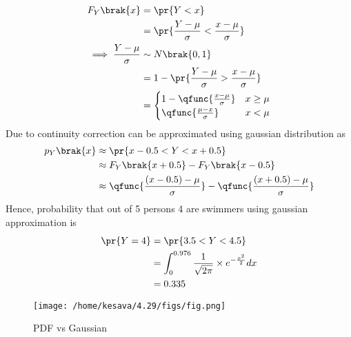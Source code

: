 \documentclass[journal,12pt,onecolumn]{IEEEtran}
\theoremstyle{remark}
\begin{document}
\begin{align}
	F_Y\brak{x}&=\pr{Y<x}\\
	&=\pr{\frac{Y-\mu}{\sigma}<\frac{x-\mu}{\sigma}}\\
	\implies \frac{Y-\mu}{\sigma} &\sim N\brak{0,1}\\
	&=1-\pr{\frac{Y-\mu}{\sigma}>\frac{x-\mu}{\sigma}}\\
	&=\begin{cases}
		1-\qfunc{\frac{x-\mu}{\sigma}} & x \geq \mu\\
		\qfunc{\frac{\mu -x}{\sigma}} & x < \mu 
	\end{cases}
\end{align}
Due to continuity correction  can be approximated using gaussian distribution as
\begin{align}
	p_Y\brak{x}  &\approx \pr{x-0.5 < Y < x+0.5}\\
	&\approx F_Y\brak{x + 0.5} - F_Y\brak{x - 0.5}\\
	&\approx \qfunc{\frac{(x-0.5)-\mu}{\sigma}} - \qfunc{\frac{(x+0.5)-\mu}{\sigma}}
\end{align}
Hence, probability that out of 5 persons 4 are swimmers using gaussian approximation is
\begin{align}
\pr{Y = 4} &= \pr{3.5 < Y < 4.5}\\
 &= \int_{0}^{0.976}\frac{1}{\sqrt{2\pi}}\times e^{-\frac{x^2}{2}}dx\\
	&= 0.335
\end{align} 

\begin{figure}[!ht]
\texttt{[image: /home/kesava/4.29/figs/fig.png]}
\caption{ PDF vs Gaussian}
\label{fig:gaussian/9/3/29/1/}
\end{figure}
\end{document}
